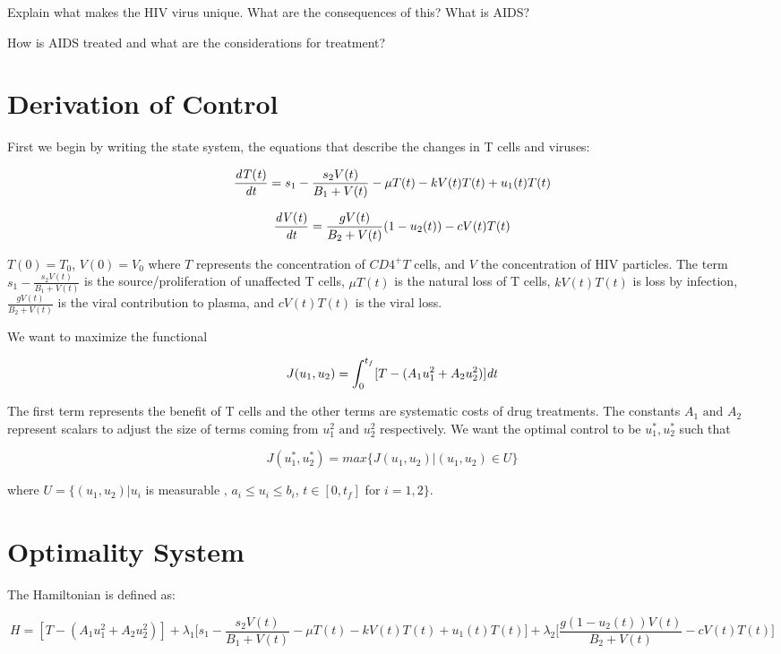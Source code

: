\begin{problem}
Explain what makes the HIV virus unique. What are the consequences of this? What is AIDS?
\label{problem:hiv:virusunderstanding}
\end{problem}

\begin{problem}
How is AIDS treated and what are the considerations for treatment?
\label{problem:hiv:treatment}
\end{problem}

\section*{Derivation of Control}
First we begin by writing the state system, the equations that describe the changes in T cells and viruses:

$$\frac{\it{d}T(t)}{\it{dt}} = s_1 - \frac{s_2V(t)}{B_1+V(t)}-\mu T(t)-kV(t)T(t)+u_1(t)T(t)$$

$$\frac{\it{d}V(t)}{\it{dt}} = \frac{gV(t)}{B_2+V(t)}(1-u_2(t))-cV(t)T(t)$$

$T(0)=T_0$, $V(0)=V_0$ where $T$ represents the concentration of $CD4^+T$ cells, and $V$ the concentration
of HIV particles. The term $s_1-\frac{s_2V(t)}{B_1+V(t)}$ is the source/proliferation of unaffected T cells,
$\mu T(t)$ is the natural loss of T cells, $kV(t)T(t)$ is loss by infection, $\frac{gV(t)}{B_2+V(t)}$ is the viral 
contribution to plasma, and $cV(t)T(t)$ is the viral loss.

We want to maximize the functional

$$J(u_1,u_2) = \int_0^{t_f}[T-(A_1u_1^2+A_2u_2^2)]\it{dt}$$

The first term represents the benefit of T cells and the other terms are systematic costs of drug treatments.
The constants $A_1\text{ and } A_2$ represent scalars to adjust the size of terms coming from $u_1^2\text{ and }u_2^2$ respectively. We
want the optimal control to be $u_1^*,u_2^*$ such that

$$J(u_1^*,u_2^*)=max\{J(u_1,u_2)|(u_1,u_2)\in U\}$$

where $U=\{(u_1,u_2)|u_i $ is measurable $,\,a_i\le u_i \le b_i$, $t\in[0,t_f]$ for $i=1,2\}$.
 
\section*{Optimality System}
The Hamiltonian is defined as:

$$H=[T-(A_1u_1^2+A_2u_2^2)]+\lambda_1\Big[ s_1 - \frac{s_2V(t)}{B_1+V(t)}-\mu T(t)-kV(t)T(t)+u_1(t)T(t) \Big] + \lambda_2 \Big[\frac{g(1-u_2(t))V(t)}{B_2+V(t)}-cV(t)T(t)\Big]$$


